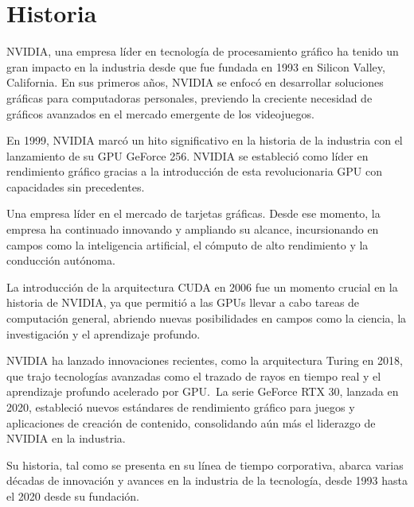 \documentclass[conference]{IEEEtran}
\begin{document}
\section{Historia}

NVIDIA, una empresa líder en tecnología de procesamiento gráfico
ha tenido un gran impacto en la industria desde que fue fundada
en 1993 en Silicon Valley, California. En sus primeros años,
NVIDIA se enfocó en desarrollar soluciones gráficas para
computadoras personales, previendo la creciente necesidad de
gráficos avanzados en el mercado emergente de los videojuegos.

En 1999, NVIDIA marcó un hito significativo en la historia de la
industria con el lanzamiento de su GPU GeForce 256. NVIDIA se
estableció como líder en rendimiento gráfico gracias a la
introducción de esta revolucionaria GPU con capacidades sin
precedentes.

Una empresa líder en el mercado de tarjetas gráficas. Desde ese
momento, la empresa ha continuado innovando y ampliando su alcance,
incursionando en campos como la inteligencia artificial, el cómputo
de alto rendimiento y la conducción autónoma.

La introducción de la arquitectura CUDA en 2006 fue un momento
crucial en la historia de NVIDIA, ya que permitió a las GPUs
llevar a cabo tareas de computación general, abriendo nuevas posibilidades en campos como la ciencia, la investigación y el aprendizaje profundo.

NVIDIA ha lanzado innovaciones recientes, como la arquitectura
Turing en 2018, que trajo tecnologías avanzadas como el trazado
de rayos en tiempo real y el aprendizaje profundo acelerado por
GPU.~La serie GeForce RTX 30, lanzada en 2020,
estableció nuevos estándares de rendimiento gráfico para
juegos y aplicaciones de creación de contenido, consolidando
aún más el liderazgo de NVIDIA en la industria.

Su historia, tal como se presenta en su línea de tiempo
corporativa, abarca varias décadas de innovación y avances
en la industria de la tecnología, desde 1993 hasta el 2020
desde su fundación.
\end{document}
